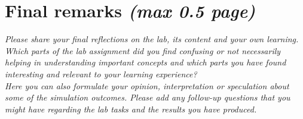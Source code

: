 \documentclass[a4paper]{article}
\begin{document}
\section{Final remarks \normalsize{\textit{(max 0.5 page)}}}
\textit{Please share your final reflections on the lab, its content and your own learning. Which parts of the lab assignment did you find confusing or not necessarily helping in understanding important concepts and which parts you have found interesting and relevant to your learning experience? \\
Here you can also formulate your opinion, interpretation or speculation about some of the simulation outcomes. Please add any follow-up questions that you might have regarding the lab tasks and the results you have produced.}

\printbibliography
\end{document}
